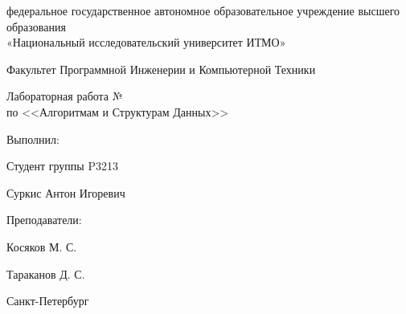 \begin{titlepage}
    \begin{center}
        федеральное государственное автономное образовательное учреждение высшего образования\\
        «Национальный исследовательский университет ИТМО»

        \bigskip

        Факультет Программной Инженерии и Компьютерной Техники

        \vfill

        {\Large
        Лабораторная работа №\LabNumber \\
        по <<Алгоритмам и Структурам Данных>>
        }
    \end{center}

    \bigskip

    \begin{flushright}
        Выполнил:

        Студент группы P3213

        Суркис Антон Игоревич

        \bigskip

        Преподаватели:

        Косяков М. С.

        Тараканов Д. С.
    \end{flushright}

    \vfill

    \begin{center}
        Санкт-Петербург

        \the\year
    \end{center}


\end{titlepage}

